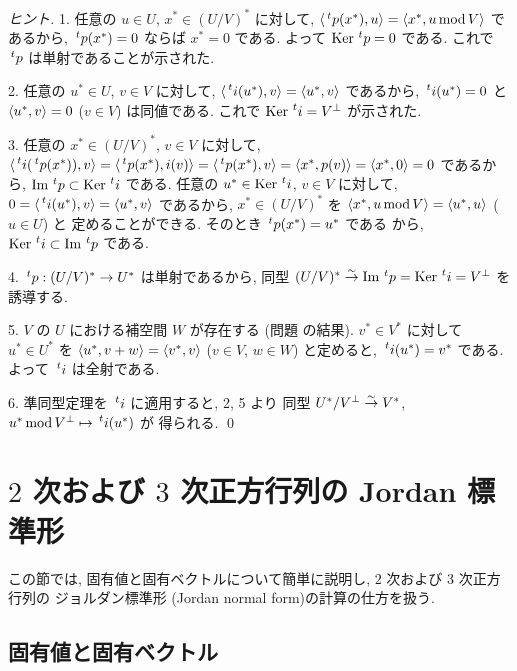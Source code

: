 \documentclass[12pt,twoside]{jarticle}
\begin{document}
\begin{proof}[ヒント]
  1. 任意の $u\in U$, $x^*\in (U/V)^*$ に対して, %
  $\bra\tp{p}(x^*),u\ket = \bra x^*,u\MOD V\ket$ であるから, %
  $\tp{p}(x^*)=0$ ならば $x^*=0$ である.
  よって $\Ker\tp{p}=0$ である.
  これで $\tp{p}$ は単射であることが示された.

  2. 任意の $u^*\in U$, $v\in V$ に対して, %
  $\bra \tp{i}(u^*),v\ket = \bra u^*,v\ket$ であるから, %
  $\tp{i}(u^*)=0$ と $\langle u^*,v\rangle=0$ ($v\in V$) は同値である.
  これで $\Ker\tp{i}=V^\bot$ が示された.

  3. 任意の $x^*\in(U/V)^*$, $v\in V$ に対して, %
  $\bra\tp{i}(\tp{p}(x^*)),v\ket 
  = \bra\tp{p}(x^*),i(v)\ket
  = \bra\tp{p}(x^*),v\ket
  = \bra x^*,p(v)\ket 
  = \bra x^*,0\ket 
  = 0$ であるから, $\Image\tp{p}\subset\Ker\tp{i}$ である.
  任意の $u^*\in\Ker\tp{i}$, $v\in V$ に対して, %
  $0 = \bra\tp{i}(u^*),v\ket
  = \bra u^*,v\ket$ であるから, $x^*\in(U/V)^*$ を %
  $\langle x^*,u\mathop{\mathrm{mod}}\nolimits V\rangle = \langle u^*,u\rangle$ ($u\in U$) と
  定めることができる. そのとき $\tp{p}(x^*)=u^*$ である
  から, $\Ker\tp{i}\subset\Image\tp{p}$ である.

  4. $\tp{p}:(U/V)^*\to U^*$ は単射であるから, 
  同型 $(U/V)^*\isomto\Image\tp{p}=\Ker\tp{i}=V^\bot$ を誘導する.

  5. $V$ の $U$ における補空間 $W$ が存在する
  (問題  の結果).
  $v^*\in V^*$ に対して $u^*\in U^*$ を $\langle u^*,v+w\rangle=\langle v^*,v\rangle$
  ($v\in V$, $w\in W$) と定めると, $\tp{i}(u^*)=v^*$ である.
  よって $\tp{i}$ は全射である.

  6. 準同型定理を $\tp{i}$ に適用すると, 2, 5 より
  同型 $U^*/V^\bot\overset\sim\rightarrow V^*$, $u^*\MOD V^\bot \mapsto \tp{i}(u^*)$ が
  得られる.
  \qed
\end{proof}

\section{$2$ 次および $3$ 次正方行列の Jordan 標準形}

この節では, 固有値と固有ベクトルについて簡単に説明し, 
$2$ 次および $3$ 次正方行列の
ジョルダン標準形 (Jordan normal form)の計算の仕方を扱う.


\subsection{固有値と固有ベクトル}
\end{document}
